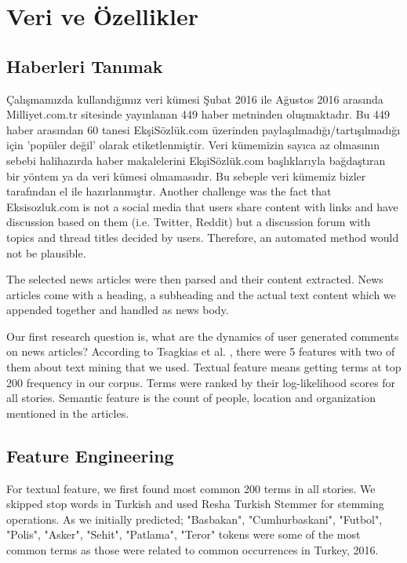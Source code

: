 \documentclass[conference]{IEEEtran}
\begin{document}
\section{Veri ve Özellikler}
\subsection{Haberleri Tanımak}
Çalışmamızda kullandığımız veri kümesi Şubat 2016 ile Ağustos 2016 arasında Milliyet.com.tr sitesinde yayınlanan 449 haber metninden oluşmaktadır. Bu 449 haber arasından 60 tanesi EkşiSözlük.com üzerinden paylaşılmadığı/tartışılmadığı için 'popüler değil' olarak etiketlenmiştir. Veri kümemizin sayıca az olmasının sebebi halihazırda haber makalelerini EkşiSözlük.com başlıklarıyla bağdaştıran bir yöntem ya da veri kümesi olmamasıdır. Bu sebeple veri kümemiz bizler tarafından el ile hazırlanmıştır.
Another challenge was the fact that Eksisozluk.com is not a social media that users share content with links and have discussion based on them (i.e. Twitter, Reddit) but a discussion forum with topics and thread titles decided by users. Therefore, an automated method would not be plausible.

The selected news articles were then parsed and their content extracted. News articles come with a heading, a subheading and the actual text content which we appended together and handled as news body.

Our first research question is, what are the dynamics of user generated comments on news articles? According to Tsagkias et al. \cite{tsagkias_predicting_2009}, there were 5 features with two of them about text mining that we used. Textual feature means getting terms at top 200 frequency in our corpus. Terms were ranked by their log-likelihood scores for all stories. Semantic feature is the count of people, location and organization mentioned in the articles.

\subsection{Feature Engineering}
For textual feature, we first found most common 200 terms in all stories. We skipped stop words in Turkish and used Resha Turkish Stemmer \cite{resha-turkish-stemmer} for stemming operations. As we initially predicted; "Basbakan", "Cumhurbaskani", "Futbol", "Polis", "Asker", "Sehit", "Patlama", "Teror" tokens were some of the most common terms as those were related to common occurrences in Turkey, 2016.
\end{document}
